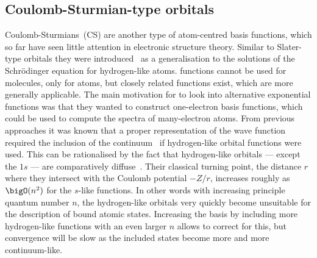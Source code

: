 \subsection{Coulomb-Sturmian-type orbitals}
\label{sec:BasisCS}
Coulomb-Sturmians~(CS) are another type of atom-centred basis functions,
which so far have seen little attention in electronic structure theory.
Similar to Slater-type orbitals
they were introduced~\cite{Shull1959}
as a generalisation to the solutions of the Schrödinger equation for hydrogen-like atoms.
\CS functions cannot be used for molecules, only for atoms,
but closely related functions exist,
which are more generally applicable.
The main motivation for \citet{Shull1959} to look into alternative
exponential functions was that they wanted to construct one-electron basis functions,
which could be used to compute the spectra of many-electron atoms.
From previous approaches it was known that a
proper representation of the wave function
required the inclusion of the continuum~\cite{Avery2006}
if hydrogen-like orbital functions were used.
This can be rationalised by the fact that hydrogen-like orbitals
--- except the $1s$ --- are comparatively diffuse~\cite{Avery2008}.
Their classical turning point,
\ie the distance $r$ where they intersect with the Coulomb potential $-Z/r$,
increases roughly as $\bigO(n^2)$ for the $s$-like functions.
In other words with increasing principle quantum number $n$,
the hydrogen-like orbitals very quickly become unsuitable for the
description of bound atomic states.
Increasing the basis by including more hydrogen-like functions
with an even larger $n$ allows to correct for this,
but convergence will be slow as the included states become
more and more continuum-like.

